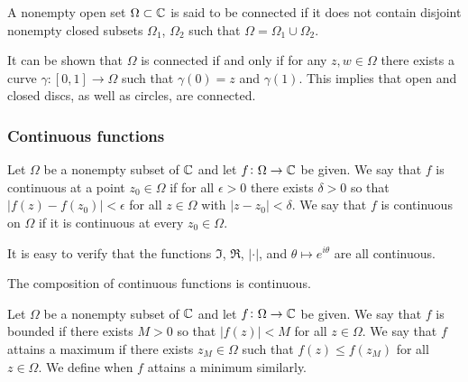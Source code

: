 \documentclass[11pt,a4paper]{article}
\begin{document}
\begin{definition}
  A nonempty open set $\Omega \subset \mathbb{C}$ is said to be connected if it does
  not contain disjoint nonempty closed subsets $\Omega_1$, $\Omega_2$ such
  that $\Omega = \Omega_1 \cup \Omega_2$.
\end{definition}

\begin{remark}
  It can be shown that $\Omega$ is connected if and only if for any
  $z, w \in \Omega$ there exists a curve $\gamma \colon [0,1] \to \Omega$
  such that $\gamma(0) = z$ and $\gamma(1)$.
  This implies that open and closed discs, as well as circles, are
  connected.
\end{remark}

\subsubsection{Continuous functions}

\begin{definition}
  Let $\Omega$ be a nonempty subset of $\mathbb{C}$ and let 
  $f \colon \Omega \to \mathbb{C}$ be given.
  We say that $f$ is continuous at a point $z_0 \in \Omega$ 
  if for all $\epsilon > 0$ there exists $\delta > 0$ so
  that $|f(z) - f(z_0)| < \epsilon$ for all $z \in \Omega$ with 
  $|z - z_0| < \delta$.
  We say that $f$ is continuous on $\Omega$ if it is continuous at every 
  $z_0 \in \Omega$.
\end{definition}

\begin{remark}
  It is easy to verify that the functions $\Im$, $\Re$, $|\cdot|$, and
  $\theta \mapsto e^{i \theta}$ are all continuous.
\end{remark}

\begin{proposition}
  The composition of continuous functions is continuous.
\end{proposition}

\begin{definition}
  Let $\Omega$ be a nonempty subset of $\mathbb{C}$ and let 
  $f \colon \Omega \to \mathbb{C}$ be given.
  We say that $f$ is bounded if there exists $M > 0$ so that 
  $|f(z)| < M$ for all $z \in \Omega$.
  We say that $f$ attains a maximum if there exists $z_M \in \Omega$
  such that $f(z) \le f(z_M)$ for all $z \in \Omega$.
  We define when $f$ attains a minimum similarly.
\end{definition}
\end{document}
